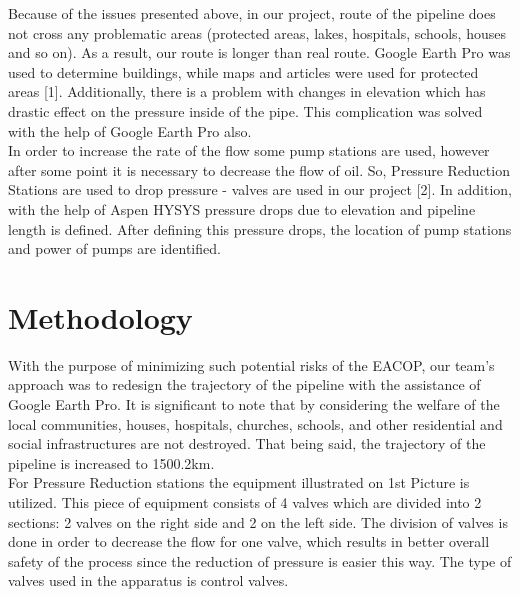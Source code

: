 \documentclass[12pt]{article}
\begin{document}
{\fontsize{12pt}{12pt}\selectfont  
\hspace*{1em} Because of the issues presented above, in our project, route of the pipeline does not cross any problematic areas (protected areas, lakes, hospitals, schools, houses and so on). As a result, our route is longer than real route. Google Earth Pro was used to determine buildings, while maps and articles were used for protected areas [1]. Additionally, there is a problem with changes in elevation which has drastic effect on the pressure inside of the pipe. This complication was solved with the help of Google Earth Pro also.
\\

In order to increase the rate of the flow some pump stations are used, however after some point it is necessary to decrease the flow of oil. So, Pressure Reduction Stations are used to drop pressure - valves are used in our project [2].  In addition, with the help of Aspen HYSYS pressure drops due to elevation and pipeline length is defined. After defining this pressure drops, the location of pump stations and power of pumps are identified.
\\

}

\section{Methodology}

{\fontsize{12pt}{12pt}\selectfont  
\hspace*{1em} With the purpose of minimizing such potential risks of the EACOP, our team's approach was to redesign the trajectory of the pipeline with the assistance of Google Earth Pro. It is significant to note that by considering the welfare of the local communities, houses, hospitals, churches, schools, and other residential and social infrastructures are not destroyed. That being said, the trajectory of the pipeline is increased to 1500.2km. 
\\

For Pressure Reduction stations the equipment illustrated on 1st Picture is utilized. This piece of equipment consists of 4 valves which are divided into 2 sections: 2 valves on the right side and 2 on the left side. The division of valves is done in order to decrease the flow for one valve, which results in better overall safety of the process since the reduction of pressure is easier this way. The type of valves used in the apparatus is control valves.
\\




}
\end{document}

